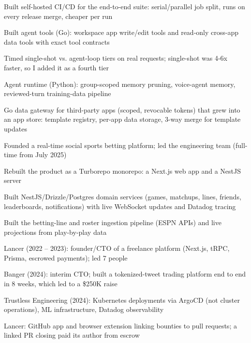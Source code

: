 \documentclass[print]{jack-resume}
\begin{document}
\begin{tightemize}
    \item Built self-hosted CI/CD for the end-to-end suite: serial/parallel job split, runs on every release merge, cheaper per run
    \item Built agent tools (Go): workspace app write/edit tools and read-only cross-app data tools with exact tool contracts
    \item Timed single-shot vs. agent-loop tiers on real requests; single-shot was 4-6x faster, so I added it as a fourth tier
    \item Agent runtime (Python): group-scoped memory pruning, voice-agent memory, reviewed-turn training-data pipeline
    \item Go data gateway for third-party apps (scoped, revocable tokens) that grew into an app store: template registry, per-app data storage, 3-way merge for template updates
\end{tightemize}
\sectionsep

\begin{tightemize}
    \item Founded a real-time social sports betting platform; led the engineering team (full-time from July 2025)
    \item Rebuilt the product as a Turborepo monorepo: a Next.js web app and a NestJS server
    \item Built NestJS/Drizzle/Postgres domain services (games, matchups, lines, friends, leaderboards, notifications) with live WebSocket updates and Datadog tracing
    \item Built the betting-line and roster ingestion pipeline (ESPN APIs) and live projections from play-by-play data
\end{tightemize}
\sectionsep

\begin{tightemize}
    \item Lancer (2022 -- 2023): founder/CTO of a freelance platform (Next.js, tRPC, Prisma, escrowed payments); led 7 people
    \item Banger (2024): interim CTO; built a tokenized-tweet trading platform end to end in 8 weeks, which led to a \$250K raise
    \item Trustless Engineering (2024): Kubernetes deployments via ArgoCD (not cluster operations), ML infrastructure, Datadog observability
    \item Lancer: GitHub app and browser extension linking bounties to pull requests; a linked PR closing paid its author from escrow
\end{tightemize}
\sectionsep
\end{document}
